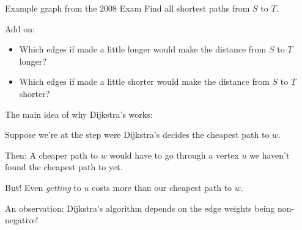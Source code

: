 \documentclass{beamer}
\begin{document}
\begin{frame}{Example graph from the 2008 Exam}
Find all shortest paths from $S$ to $T$.
\begin{center}
\end{center}

\begin{block}{Add on:}
\begin{itemize}
\item  Which edges if made a little longer would make the distance from $S$ to $T$ longer?
\item  Which edges if made a little shorter would make the distance from $S$ to $T$ shorter?
\end{itemize}
\end{block}

  \end{frame}


\begin{frame}{The main idea of why Dijkstra's works:}


Suppose we're at the step were Dijkstra's decides the cheapest path to $w$. 
\begin{block}{Then:}
A cheaper path to $w$ would have to go through a vertex $u$ we haven't found the cheapest path to yet.
  \end{block}

  \begin{block}{But!}
Even \emph{getting} to $u$ costs more than our cheapest path to $w$.
    \end{block}

  \begin{block}{An observation:}
Dijkstra's algorithm depends on the edge weights being non-negative!
  \end{block}
  
  \end{frame}
\end{document}
